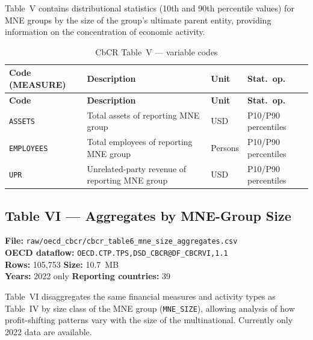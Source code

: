 \documentclass[11pt,a4paper]{article}
\begin{document}
Table~V contains distributional statistics (10th and 90th percentile values) for
MNE groups by the size of the group's ultimate parent entity, providing
information on the concentration of economic activity.

\begin{longtable}{L{2.8cm} L{5.5cm} C{1.8cm} C{2.5cm}}
    \caption{CbCR Table~V --- variable codes}
    \label{tab:cbcr_t5}\\
    \toprule
    \textbf{Code (MEASURE)} & \textbf{Description} & \textbf{Unit} & \textbf{Stat.\ op.}\\
    \midrule
    \endfirsthead
    \toprule
    \textbf{Code} & \textbf{Description} & \textbf{Unit} & \textbf{Stat.\ op.}\\
    \midrule
    \endhead
    \bottomrule
    \endlastfoot
    \texttt{ASSETS}    & Total assets of reporting MNE group & USD & P10/P90 percentiles \\
    \texttt{EMPLOYEES} & Total employees of reporting MNE group & Persons & P10/P90 percentiles \\
    \texttt{UPR}       & Unrelated-party revenue of reporting MNE group & USD & P10/P90 percentiles \\
\end{longtable}

\subsection{Table VI --- Aggregates by MNE-Group Size}
\label{subsec:cbcr_t6}

\textbf{File:} \texttt{raw/oecd\_cbcr/cbcr\_table6\_mne\_size\_aggregates.csv}\\
\textbf{OECD dataflow:} \texttt{OECD.CTP.TPS,DSD\_CBCR@DF\_CBCRVI,1.1}\\
\textbf{Rows:} 105{,}753 \quad \textbf{Size:} 10.7~MB\\
\textbf{Years:} 2022 only \quad \textbf{Reporting countries:} 39

Table~VI disaggregates the same financial measures and activity types as
Table~IV by size class of the MNE group (\texttt{MNE\_SIZE}), allowing
analysis of how profit-shifting patterns vary with the size of the multinational.
Currently only 2022 data are available.
\end{document}

